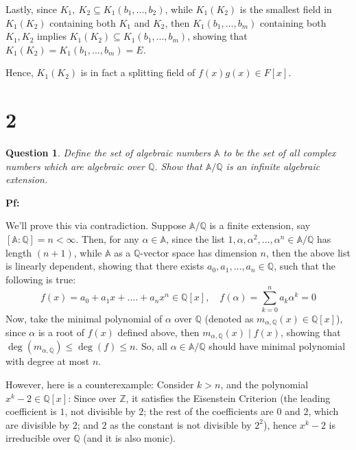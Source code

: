 \documentclass{article}
\newtheorem{question}{Question}
\begin{document}
Lastly, since $K_1,\ K_2\subseteq K_1(b_1,...,b_2)$, while $K_1(K_2)$ is the smallest field in $K_1(K_2)$ containing both $K_1$ and $K_2$, then $K_1(b_1,...,b_m)$ containing both $K_1,K_2$ implies $K_1(K_2)\subseteq K_1(b_1,...,b_m)$,
showing that $K_1(K_2)=K_1(b_1,...,b_m)=E$.

Hence, $K_1(K_2)$ is in fact a splitting field of $f(x)g(x)\in F[x]$.

\break

\section*{2}
\begin{myBox}[]{}
    \begin{question}
        Define the set of algebraic numbers $\mathbb{A}$ to be the set of all complex numbers which are
        algebraic over $\mathbb{Q}$. Show that $\mathbb{A}/\mathbb{Q}$ is an infinite algebraic extension.
    \end{question}
\end{myBox}

\textbf{Pf:}

We'll prove this via contradiction. Suppose $\mathbb{A}/\mathbb{Q}$ is a finite extension, say $[\mathbb{A}:\mathbb{Q}]=n<\infty$.
Then, for any $\alpha\in\mathbb{A}$, since the list $1,\alpha,\alpha^2,...,\alpha^n\in\mathbb{A}/\mathbb{Q}$ has length $(n+1)$, while $\mathbb{A}$ as a $\mathbb{Q}$-vector space
has dimension $n$, then the above list is linearly dependent, showing that there exists $a_0,a_1,...,a_n\in\mathbb{Q}$, such that the following is true:
$$f(x)=a_0+a_1x+....+a_nx^n\in\mathbb{Q}[x],\quad f(\alpha)=\sum_{k=0}^{n}a_k\alpha^k=0$$
Now, take the minimal polynomial of $\alpha$ over $\mathbb{Q}$ (denoted as $m_{\alpha,\mathbb{Q}}(x)\in\mathbb{Q}[x]$), since $\alpha$ is a root of $f(x)$ defined above,
then $m_{\alpha,\mathbb{Q}}(x)\mid f(x)$, showing that $\deg(m_{\alpha,\mathbb{Q}})\leq \deg(f)\leq n$. So, all $\alpha\in\mathbb{A}/\mathbb{Q}$ should have minimal polynomial with degree at most $n$.

\hfil

However, here is a counterexample: Consider $k>n$, and the polynomial $x^k-2\in\mathbb{Q}[x]$:
Since over $\mathbb{Z}$, it satisfies the Eisenstein Criterion (the leading coefficient is $1$, not divisible by $2$; the rest of the coefficients are $0$ and $2$, which are divisible by $2$; and $2$ as the constant is not divisible by $2^2$),
hence $x^k-2$ is irreducible over $\mathbb{Q}$ (and it is also monic).
\end{document}
